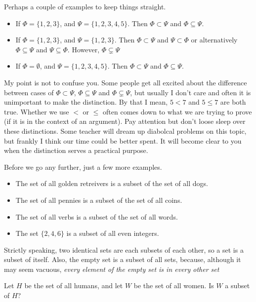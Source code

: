 \begin{example}[Subsets] Perhaps a couple of examples to keep things straight.
\begin{itemize}
\item If $\Phi = \{1, 2, 3\}$, and  $\Psi = \{1, 2, 3, 4, 5 \}$.  Then $\Phi\subset \Psi$ and $\Phi\subseteq \Psi$.
\item If $\Phi = \{1, 2, 3\}$, and  $\Psi = \{1, 2, 3 \}$.  Then $\Phi\subset \Psi$ and $\Psi\subset \Phi$ or alternatively $\Phi\subseteq \Psi$ and $\Psi\subseteq \Phi$.  However, $\Phi\subsetneq \Psi$
\item If $\Phi =\emptyset$, and  $\Psi = \{1, 2, 3, 4, 5 \}$.  Then $\Phi\subset \Psi$ and $\Phi\subseteq \Psi$.
\end{itemize}
My point is not to confuse you.  Some people get all excited about the difference between cases of $\Phi\subset \Psi$, $\Phi\subseteq \Psi$ and $\Phi\subsetneq \Psi$, but usually I don't care and often it is unimportant to make the distinction.  By that I mean, $5<7$ and $5\le7$ are both true. Whether we use $<$ or $\le$ often comes down to what we are trying to prove (if it is in the context of an argument).  Pay attention but don't loose sleep over these distinctions.  Some teacher will dream up diabolcal problems on this topic, but frankly I think our time could be better spent.  It will become clear to you when the distinction serves a practical purpose.

Before we go any further, just a few more examples.
\begin{itemize}
\item The set of all golden retreivers is a subset of the set of all dogs.
\item The set of all pennies is a subset of the set of all coins.
\item The set of all verbs is a subset of the set of all words.
\item The set $\{2, 4, 6  \}$ is a subset of all even integers.
\end{itemize}
\end{example}
\begin{remark}Strictly speaking, two identical sets are each subsets of each other, so a set is a subset of itself.  Also, the empty set is a subset of all sets, because, although it may seem vacuous, \emph{every element of the empty set is in every other set}
\end{remark}




\begin{problem}[Is $W$ a subset of $H$?]
Let $H$ be the set of all humans, and let $W$ be the set of all women.   Is $W$ a subset of $H$?
\vspace{1em}

\end{problem}


